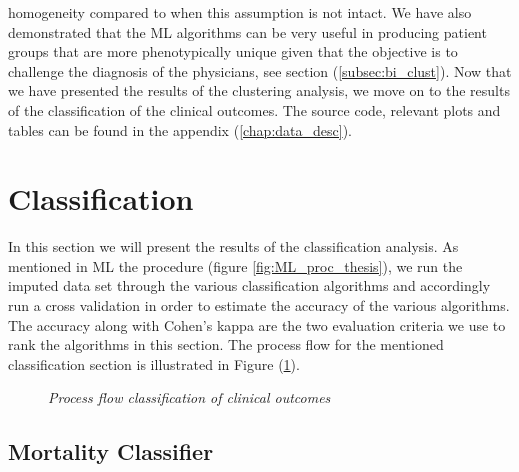\documentclass[../thesis.tex]{subfiles}
\begin{document}
homogeneity compared to when this assumption is not intact. We have also demonstrated that the ML algorithms can be very useful in producing patient groups that are more phenotypically unique given that the objective is to challenge the diagnosis of the physicians, see section (\ref{subsec:bi_clust}). Now that we have presented the results of the clustering analysis, we move on to the results of the classification of the clinical outcomes. The source code, relevant plots and tables can be found in the appendix (\ref{chap:data_desc}).

\section{Classification}

\noindent In this section we will present the results of the classification analysis. As mentioned in ML the procedure (figure \ref{fig:ML_proc_thesis}), we run the imputed data set through the various classification algorithms and accordingly run a cross validation in order to estimate the accuracy of the various algorithms. The accuracy along with Cohen’s kappa are the two evaluation criteria we use to rank the algorithms in this section. The process flow for the mentioned classification section is illustrated in Figure (\ref{fig:process_flow_classification}). 

\begin{figure}
    \centering
    
    \caption[Process flow classification of clinical outcomes]{\textit{Process flow classification of clinical outcomes}}
    \label{fig:process_flow_classification}
\end{figure}

\subsection{Mortality Classifier}
\end{document}
